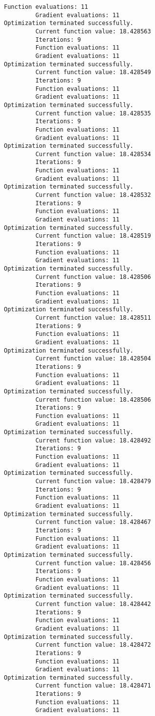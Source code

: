 \documentclass[11pt]{article}
\begin{document}
\begin{Verbatim}[commandchars=\\\{\}]
         Function evaluations: 11
         Gradient evaluations: 11
Optimization terminated successfully.
         Current function value: 18.428563
         Iterations: 9
         Function evaluations: 11
         Gradient evaluations: 11
Optimization terminated successfully.
         Current function value: 18.428549
         Iterations: 9
         Function evaluations: 11
         Gradient evaluations: 11
Optimization terminated successfully.
         Current function value: 18.428535
         Iterations: 9
         Function evaluations: 11
         Gradient evaluations: 11
Optimization terminated successfully.
         Current function value: 18.428534
         Iterations: 9
         Function evaluations: 11
         Gradient evaluations: 11
Optimization terminated successfully.
         Current function value: 18.428532
         Iterations: 9
         Function evaluations: 11
         Gradient evaluations: 11
Optimization terminated successfully.
         Current function value: 18.428519
         Iterations: 9
         Function evaluations: 11
         Gradient evaluations: 11
Optimization terminated successfully.
         Current function value: 18.428506
         Iterations: 9
         Function evaluations: 11
         Gradient evaluations: 11
Optimization terminated successfully.
         Current function value: 18.428511
         Iterations: 9
         Function evaluations: 11
         Gradient evaluations: 11
Optimization terminated successfully.
         Current function value: 18.428504
         Iterations: 9
         Function evaluations: 11
         Gradient evaluations: 11
Optimization terminated successfully.
         Current function value: 18.428506
         Iterations: 9
         Function evaluations: 11
         Gradient evaluations: 11
Optimization terminated successfully.
         Current function value: 18.428492
         Iterations: 9
         Function evaluations: 11
         Gradient evaluations: 11
Optimization terminated successfully.
         Current function value: 18.428479
         Iterations: 9
         Function evaluations: 11
         Gradient evaluations: 11
Optimization terminated successfully.
         Current function value: 18.428467
         Iterations: 9
         Function evaluations: 11
         Gradient evaluations: 11
Optimization terminated successfully.
         Current function value: 18.428456
         Iterations: 9
         Function evaluations: 11
         Gradient evaluations: 11
Optimization terminated successfully.
         Current function value: 18.428442
         Iterations: 9
         Function evaluations: 11
         Gradient evaluations: 11
Optimization terminated successfully.
         Current function value: 18.428472
         Iterations: 9
         Function evaluations: 11
         Gradient evaluations: 11
Optimization terminated successfully.
         Current function value: 18.428471
         Iterations: 9
         Function evaluations: 11
         Gradient evaluations: 11

    \end{Verbatim}
\end{document}
